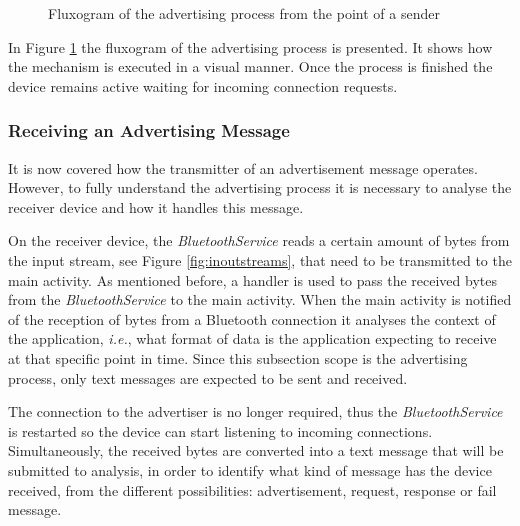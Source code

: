 \begin{figure}[ht]
   \noindent{}
	\caption{\label{fig:advflux} Fluxogram of the advertising process from the point of a sender}
\end{figure}

In Figure \ref{fig:advflux} the fluxogram of the advertising process is presented. It shows how the mechanism is executed in a visual manner. Once the process is finished the device remains active waiting for incoming connection requests.

\subsubsection{Receiving an Advertising Message}
\label{subsubsec:rcvadv}

It is now covered how the transmitter of an advertisement message operates. However, to fully understand the advertising process it is necessary to analyse the receiver device and how it handles this message. 

On the receiver device, the \textit{BluetoothService} reads a certain amount of bytes from the input stream, see Figure \ref{fig:inoutstreams}, that need to be transmitted to the main activity. As mentioned before, a handler is used to pass the received bytes from the \textit{BluetoothService} to the main activity. When the main activity is notified of the reception of bytes from a Bluetooth connection it analyses the context of the application, \textit{i.e.}, what format of data is the application expecting to receive at that specific point in time. Since this subsection scope is the advertising process, only text messages are expected to be sent and received.

The connection to the advertiser is no longer required, thus the \textit{BluetoothService} is restarted so the device can start listening to incoming connections. Simultaneously, the received bytes are converted into a text message that will be submitted to analysis, in order to identify what kind of message has the device received, from the different possibilities: advertisement, request, response or fail message.

